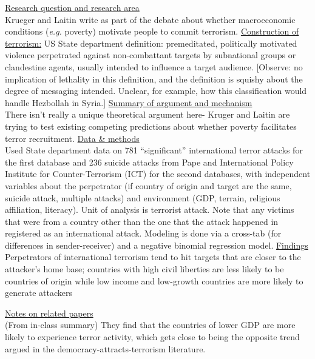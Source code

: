 \documentclass{article}[12pt]
\begin{document}
\underline{Research question and research area}\\  Krueger and Laitin write as part of the debate about whether macroeconomic conditions (\textit{e.g.} poverty) motivate people to commit terrorism. 
\underline{Construction of terrorism:} US State department definition: premeditated, politically motivated violence perpetrated against non-combattant targets by subnational groups or clandestine agents, usually intended to influence a target audience. [Observe: no implication of lethality in this definition, and the definition is squishy about the degree of messaging intended.  Unclear, for example, how this classification would handle Hezbollah in Syria.]
\underline{Summary of argument and mechanism}\\ There isn't really a unique theoretical argument here- Kruger and Laitin are trying to test existing competing predictions about whether poverty facilitates terror recruitment.
\underline{Data \& methods}\\ Used State department data on 781 ``significant'' international terror attacks for the first database and 236 suicide attacks from Pape and International Policy Institute for Counter-Terrorism (ICT) for the second databases, with independent variables about the perpetrator (if country of origin and target are the same, suicide attack, multiple attacks) and environment (GDP, terrain, religious affiliation, literacy). Unit of analysis is terrorist attack. Note that any victims that were from a country other than the one that the attack happened in registered as an international attack. Modeling is done via a cross-tab (for differences in sender-receiver) and a negative binomial regression model.
\underline{Findings}\\ Perpetrators of international terrorism tend to hit targets that are closer to the attacker's home base; countries with high civil liberties are less likely to be countries of origin while low income and low-growth countries are more likely to generate attackers


\underline{Notes on related papers}\\ (From in-class summary) They find that the countries of lower GDP are more likely to experience terror activity, which gets close to being the opposite trend argued in the democracy-attracts-terrorism literature.
\end{document}
